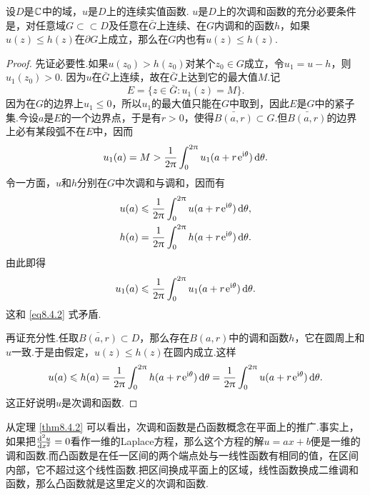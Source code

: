 \begin{theorem}\label{thm8.4.2}
  设$D$是$\mathbb C$中的域，$u$是$D$上的连续实值函数. $u$是$D$上的次调和函数的充分必要条件是，对任意域$G\subset\subset D$及任意在$\bar G$上连续、在$G$内调和的函数$h$，如果$u(z)\le h(z)$在$\partial G$上成立，那么在$G$内也有$u(z)\le h(z)$.
\end{theorem}
\begin{proof}
  先证必要性.如果$u(z_0)>h(z_0)$对某个$z_0\in G$成立，令$u_1=u-h$，则$u_1(z_0)>0$. 因为$u$在$\bar G$上连续，故在$\bar G$上达到它的最大值$M$.记
  \[
    E = \{z\in\bar G:u_1(z) = M\}.
  \]
  因为在$G$的边界上$u_1\le0$，所以$u_1$的最大值只能在$G$中取到，因此$E$是$G$中的紧子集.今设$a$是$E$的一个边界点，于是有$r>0$，使得$\bar{B(a,r)}\subset G$.但$\bar{B(a,r)}$的边界上必有某段弧不在$E$中，因而
  \begin{equation}\label{eq8.4.2}
    u_1(a) = M > \frac1{2\uppi}\int_0^{2\uppi}u_1(a+r\operatorname{\!\!\;\mathrm e}^{\mathrm i\theta})\mathop{}\!\mathrm{d} \theta.
  \end{equation}
  令一方面，$u$和$h$分别在$G$中次调和与调和，因而有
  \begin{align*}
    & u(a) \leqslant \frac1{2\uppi}\int_0^{2\uppi}u(a+r\operatorname{\!\!\;\mathrm e}^{\mathrm i\theta})\mathop{}\!\mathrm{d} \theta,\\
    & h(a) = \frac1{2\uppi}\int_0^{2\uppi}h(a+r\operatorname{\!\!\;\mathrm e}^{\mathrm i\theta})\mathop{}\!\mathrm{d} \theta.
  \end{align*}
  由此即得
  \[
    u_1(a) \leqslant \frac1{2\uppi}\int_0^{2\uppi}u_1(a+r\operatorname{\!\!\;\mathrm e}^{\mathrm i\theta})\mathop{}\!\mathrm{d} \theta.
  \]
  这和 \eqref{eq8.4.2} 式矛盾.

  再证充分性.任取$\bar{B(a,r)}\subset D$，那么存在$B(a,r)$中的调和函数$h$，它在圆周上和$u$一致.于是由假定，$u(z)\le h(z)$在圆内成立.这样
  \[
    u(a)\leqslant h(a) = \frac1{2\uppi}\int_0^{2\uppi}h(a+r\operatorname{\!\!\;\mathrm e}^{\mathrm i\theta})\mathop{}\!\mathrm{d} \theta
    = \frac1{2\uppi}\int_0^{2\uppi}u(a+r\operatorname{\!\!\;\mathrm e}^{\mathrm i\theta})\mathop{}\!\mathrm{d} \theta.
  \]
  这正好说明$u$是次调和函数.
\end{proof}

从定理 \ref{thm8.4.2} 可以看出，次调和函数是凸函数概念在平面上的推广.事实上，如果把$\frac{\mathop{}\!\mathrm d^2u}{\mathop{}\!\mathrm dx^2}=0$看作一维的Laplace方程，那么这个方程的解$u=ax+b$便是一维的调和函数.而凸函数是在任一区间的两个端点处与一线性函数有相同的值，在区间内部，它不超过这个线性函数.把区间换成平面上的区域，线性函数换成二维调和函数，那么凸函数就是这里定义的次调和函数.

